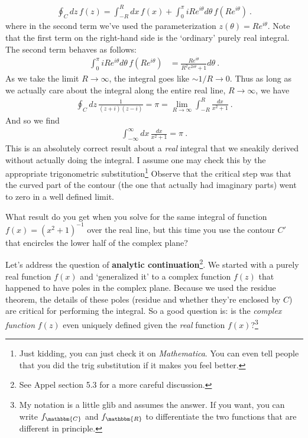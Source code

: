 \begin{example}
\begin{align}
	\oint_C dz\, f(z) = \int_{-R}^R dx\, f(x) 
	+ \int_0^\pi iR e^{i\theta} d\theta  \, f\left(Re^{i\theta}\right) \ .
\end{align}
where in the second term we've used the parameterization $z(\theta) = Re^{i\theta}$. Note that the first term on the right-hand side is the `ordinary' purely real integral. The second term behaves as follows:
\begin{align}
	\int_0^\pi iR e^{i\theta} d\theta  \, f\left(Re^{i\theta}\right)
	&= 
	\frac{Re^{i\theta}}{R^2 e^{2i\theta}+1} d\theta \ .
\end{align}
As we take the limit $R\to\infty$, the integral goes like $\sim 1/R \to 0$. Thus as long as we actually care about the integral along the entire real line, $R\to \infty$, we have
\begin{align}
	\oint_Cdz\, \frac{1}{(z+i)(z-i)}  
	= \pi 
	= \lim_{R\to\infty} \int_{-R}^R \frac{dx}{x^2+1} \ .
\end{align}
And so we find
\begin{align}
	\int_{-\infty}^\infty dx \, 
	\frac{dx}{x^2+1}
	= \pi \ .
\end{align}
This is an absolutely correct result about a \emph{real} integral that we sneakily derived without actually doing the integral. I assume one may check this by the appropriate trigonometric substitution\footnote{Just kidding, you can just check it on \emph{Mathematica}. You can even tell people that you did the trig substitution if it makes you feel better.} Observe that the critical step was that the curved part of the contour (the one that actually had imaginary parts) went to zero in a well defined limit. 
\end{example}
\begin{exercise}
What result do you get when you solve for the same integral of function $f(x)=(x^2+1)^{-1}$ over the real line, but this time you use the contour $C'$ that encircles the lower half of the complex plane?
\end{exercise}
Let's address the question of \textbf{analytic continuation}\footnote{See Appel section 5.3 for a more careful discussion.}. We started with a purely real function $f(x)$ and `generalized it' to a complex function $f(z)$ that happened to have poles in the complex plane. Because we used the residue theorem, the details of these poles (residue and whether they're enclosed by $C$) are critical for performing the integral. So a good question is: is the \emph{complex function} $f(z)$ even uniquely defined given the \emph{real} function $f(x)$?\footnote{My notation is a little glib and assumes the answer. If you want, you can write $f_\mathbbm{C}$ and $f_\mathbbm{R}$ to differentiate the two functions that are different in principle.}
